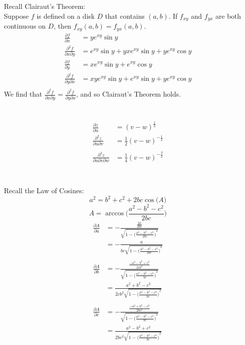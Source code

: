 \documentclass{article}
\begin{document}
\section{} %
	Recall Clairaut's Theorem:\\
	Suppose $f$ is defined on a disk $D$ that contains $(a,b)$. If $f_{xy}$ and $f_{yx}$
	are both continuous on $D$, then $f_{xy}(a,b)=f_{yx}(a,b)$.
	\begin{align*}
		\frac{\partial{f}}{\partial{x}}&=ye^{xy}\sin{y}\\
		\frac{\partial^2{f}}{\partial{x}\partial{y}}&=e^{xy}\sin{y}+yxe^{xy}\sin{y}+ye^{xy}\cos{y}\\
		\frac{\partial{f}}{\partial{y}}&=xe^{xy}\sin{y}+e^{xy}\cos{y}\\
		\frac{\partial^2{f}}{\partial{y}\partial{x}}&=xye^{xy}\sin{y}+e^{xy}\sin{y}+ye^{xy}\cos{y}\\
	\end{align*}
	We find that $\frac{\partial^2{f}}{\partial{x}\partial{y}}=\frac{\partial^2{f}}{\partial{y}\partial{x}}$,
	and so Clairaut's Theorem holds.
\section{} %
	\begin{align*}
		\frac{\partial{z}}{\partial{u}}&={(v-w)}^\frac{1}{2}\\
		\frac{\partial^2{z}}{\partial{u}\partial{v}}&=\frac{1}{2}{(v-w)}^{-\frac{1}{2}}\\\\
		\frac{\partial^3{z}}{\partial{u}\partial{v}\partial{w}}&=\frac{1}{4}{(v-w)}^{-\frac{3}{2}}\\
	\end{align*}
\section{} %
	Recall the Law of Cosines:\\
	\[a^2=b^2+c^2+2bc\cos{\big(A\big)}\]
	\[A=\arccos{\Big(\frac{a^2-b^2-c^2}{2bc}\Big)}\]
	\begin{align*}
		\frac{\partial{A}}{\partial{a}}&=-\frac{\frac{2a}{2bc}}{\sqrt{1-{\big(\frac{a^2-b^2-c^2}{2bc}\big)}^2}}\\
		&=-\frac{a}{bc\sqrt{1-{\big(\frac{a^2-b^2-c^2}{2bc}\big)}^2}}\\\\
		\frac{\partial{A}}{\partial{b}}&=-\frac{\frac{-a^2-b^2+c^2}{2cb^2}}{\sqrt{1-{\big(\frac{a^2-b^2-c^2}{bc}\big)}^2}}\\
		&=\frac{a^2+b^2-c^2}{2cb^2\sqrt{1-{\big(\frac{a^2-b^2-c^2}{bc}\big)}^2}}\\\\
		\frac{\partial{A}}{\partial{c}}&=-\frac{\frac{-a^2+b^2-c^2}{2bc^2}}{\sqrt{1-{\big(\frac{a^2-b^2-c^2}{bc}\big)}^2}}\\
		&=\frac{a^2-b^2+c^2}{2bc^2\sqrt{1-{\big(\frac{a^2-b^2-c^2}{bc}\big)}^2}}\\
	\end{align*}
\end{document}
